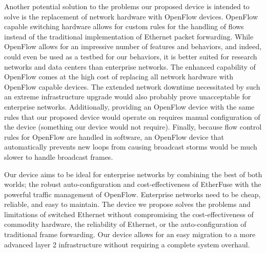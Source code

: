 \documentclass{article}
\begin{document}
	Another potential solution to the problems our proposed device is intended to solve is the replacement of network hardware with OpenFlow devices.
	OpenFlow capable switching hardware allows for custom rules for the handling of flows instead of the traditional implementation of Ethernet packet forwarding.
	While OpenFlow allows for an impressive number of features and behaviors, and indeed, could even be used as a testbed for our behaviors, it is better suited for research networks and data centers than enterprise networks.
	The enhanced capability of OpenFlow comes at the high cost of replacing all network hardware with OpenFlow capable devices.
	The extended network downtime necessitated by such an extreme infrastructure upgrade would also probably prove unacceptable for enterprise networks.
	Additionally, providing an OpenFlow device with the same rules that our proposed device would operate on requires manual configuration of the device (something our device would not require).
	Finally, because flow control rules for OpenFlow are handled in software, an OpenFlow device that automatically prevents new loops from causing broadcast storms would be much slower to handle broadcast frames.

	Our device aims to be ideal for enterprise networks by combining the best of both worlds; the robust auto-configuration and cost-effectiveness of EtherFuse with the powerful traffic management of OpenFlow.
	Enterprise networks need to be cheap, reliable, and easy to maintain.
	The device we propose solves the problems and limitations of switched Ethernet without compromising the cost-effectiveness of commodity hardware, the reliability of Ethernet, or the auto-configuration of traditional frame forwarding.
	Our device allows for an easy migration to a more advanced layer 2 infrastructure without requiring a complete system overhaul.

\newpage


\end{document}
